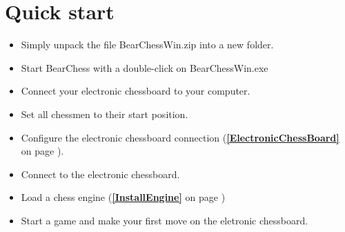 \documentclass[11pt,a4paper]{article}
\begin{document}
\section{Quick start}
\begin{itemize}
	\item Simply unpack the file BearChessWin.zip into a new folder.
	\item Start BearChess with a double-click on BearChessWin.exe
	\item Connect your electronic chessboard to your computer.
	\item Set all chessmen to their start position.
	\item Configure the electronic chessboard connection (\textbf{\ref{ElectronicChessBoard}  } on page \pageref{ElectronicChessBoard}).
	\item Connect to the electronic chessboard.
	\item Load a chess engine (\textbf{\ref{InstallEngine}  } on page \pageref{InstallEngine})
	\item Start a game and make your first move on the eletronic chessboard.
\end{itemize}
\end{document}
